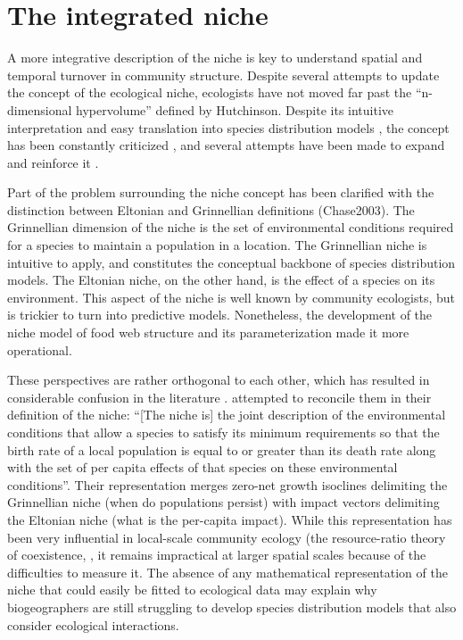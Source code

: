 \documentclass[12pt]{article}
\begin{document}
\section*{The integrated niche}

A more integrative description of the niche is key to understand spatial and
temporal turnover in community structure. Despite several attempts to update
the concept of the ecological niche, ecologists have not moved far past the
“n-dimensional hypervolume” defined by Hutchinson. Despite its intuitive
interpretation and easy translation into species distribution models
\citep{Boulangeat2012, Blonder2014}, the concept has been constantly
criticized \citep{Hardin1960, Peters1991, Silvertown2004}, and several
attempts have been made to expand and reinforce it \citep{Pulliam2000,
Chase2003, Soberon2007, Holt2009, McInerny2012b}.

Part of the problem surrounding the niche concept has been clarified with the
distinction between Eltonian and Grinnellian definitions (Chase2003). The
Grinnellian dimension of the niche is the set of environmental conditions
required for a species to maintain a population in a location. The Grinnellian
niche is intuitive to apply, and constitutes the conceptual backbone of
species distribution models. The Eltonian niche, on the other hand, is the
effect of a species on its environment. This aspect of the niche is well known
by community ecologists, but is trickier to turn into predictive models.
Nonetheless, the development of the niche model of food web structure
\citep{Williams2000} and its parameterization \citep{Williams2010; Gravel2013}
made it more operational.

These perspectives are rather orthogonal to each other, which has resulted in
considerable confusion in the literature \citep{McInerny2012a}.
\citealt{Chase2003} attempted to reconcile them in their definition of the
niche: “[The niche is] the joint description of the environmental conditions
that allow a species to satisfy its minimum requirements so that the birth
rate of a local population is equal to or greater than its death rate along
with the set of per capita effects of that species on these environmental
conditions”. Their representation merges zero-net growth isoclines delimiting
the Grinnellian niche (when do populations persist) with impact vectors
delimiting the Eltonian niche (what is the per-capita impact). While this
representation has been very influential in local-scale community ecology (the
resource-ratio theory of coexistence, \citealt{Tilman1982}, it remains
impractical at larger spatial scales because of the difficulties to measure
it. The absence of any mathematical representation of the niche that could
easily be fitted to ecological data may explain why biogeographers are still
struggling to develop species distribution models that also consider
ecological interactions.
\end{document}
